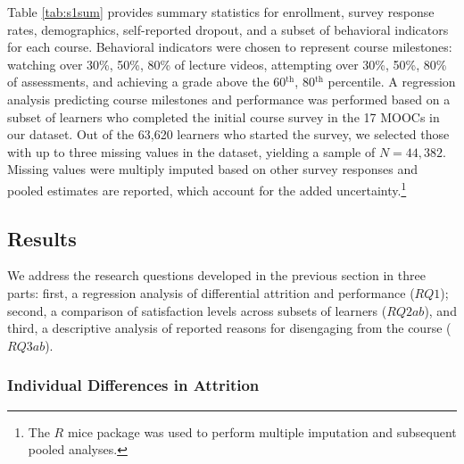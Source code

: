 \documentclass{sigchi}\usepackage[]{graphicx}\usepackage[]{color}
\begin{document}
Table \ref{tab:s1sum} provides summary statistics for enrollment, survey response rates, demographics, self-reported dropout, and a subset of behavioral indicators for each course. Behavioral indicators were chosen to represent course milestones: watching over 30\%, 50\%, 80\% of lecture videos, attempting over 30\%, 50\%, 80\% of assessments, and achieving a grade above the 60$^\text{th}$, 80$^\text{th}$ percentile. A regression analysis predicting course milestones and performance was performed based on a subset of learners who completed the initial course survey in the 17 MOOCs in our dataset. Out of the 63,620 learners who started the survey, we selected those with up to three missing values in the dataset, yielding a sample of $N=44,382$. Missing values were multiply imputed based on other survey responses and pooled estimates are reported, which account for the added uncertainty.\footnote{The $R$ mice package was used to perform multiple imputation and subsequent pooled analyses.}
 
\subsection{Results}

We address the research questions developed in the previous section in three parts: first, a regression analysis of differential attrition and performance ($RQ1$); second, a comparison of satisfaction levels across subsets of learners ($RQ2ab$), and third, a descriptive analysis of reported reasons for disengaging from the course ($RQ3ab$).

\subsubsection{Individual Differences in Attrition}
\end{document}

